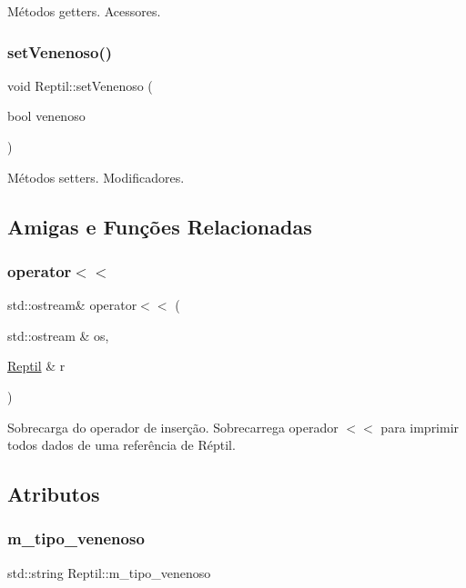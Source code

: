 Métodos getters. Acessores. \mbox{\label{classReptil_a9f7ab2a0e2b30040c7c9df48039a266a}} 
\subsubsection{\texorpdfstring{set\+Venenoso()}{setVenenoso()}}
{\footnotesize\ttfamily void Reptil\+::set\+Venenoso (\begin{DoxyParamCaption}\item[{bool}]{venenoso }\end{DoxyParamCaption})}

Métodos setters. Modificadores. 

\subsection{Amigas e Funções Relacionadas}
\mbox{\label{classReptil_a9634321aa61220b56b433a92fd851bad}} 
\subsubsection{\texorpdfstring{operator$<$$<$}{operator<<}}
{\footnotesize\ttfamily std\+::ostream\& operator$<$$<$ (\begin{DoxyParamCaption}\item[{std\+::ostream \&}]{os,  }\item[{\hyperlink{classReptil}{Reptil} \&}]{r }\end{DoxyParamCaption})\hspace{0.3cm}{\ttfamily [friend]}}

Sobrecarga do operador de inserção. Sobrecarrega operador $<$$<$ para imprimir todos dados de uma referência de Réptil. 

\subsection{Atributos}
\mbox{\label{classReptil_a0c68bf074b4645f98436016d9ceb358a}} 
\subsubsection{\texorpdfstring{m\+\_\+tipo\+\_\+venenoso}{m\_tipo\_venenoso}}
{\footnotesize\ttfamily std\+::string Reptil\+::m\+\_\+tipo\+\_\+venenoso\hspace{0.3cm}{\ttfamily [protected]}}

